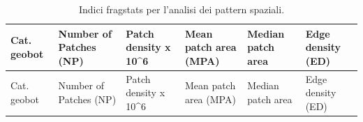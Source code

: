 \documentclass[
  a4paper,
]{book}
\begin{document}
\begin{longtable}[]{@{}
  >{\raggedleft\arraybackslash}p{}
  >{\raggedleft\arraybackslash}p{}
  >{\raggedleft\arraybackslash}p{}
  >{\raggedleft\arraybackslash}p{}
  >{\raggedleft\arraybackslash}p{}
  >{\raggedleft\arraybackslash}p{}@{}}
\caption{\label{tab:fragIndex1} Indici fragstats per l'analisi dei pattern spaziali.}\tabularnewline
\toprule\noalign{}
\begin{minipage}[b]{\linewidth}\raggedleft
Cat. geobot
\end{minipage} & \begin{minipage}[b]{\linewidth}\raggedleft
Number of Patches (NP)
\end{minipage} & \begin{minipage}[b]{\linewidth}\raggedleft
Patch density x 10\^{}6
\end{minipage} & \begin{minipage}[b]{\linewidth}\raggedleft
Mean patch area (MPA)
\end{minipage} & \begin{minipage}[b]{\linewidth}\raggedleft
Median patch area
\end{minipage} & \begin{minipage}[b]{\linewidth}\raggedleft
Edge density (ED)
\end{minipage} \\
\midrule\noalign{}
\endfirsthead
\toprule\noalign{}
\begin{minipage}[b]{\linewidth}\raggedleft
Cat. geobot
\end{minipage} & \begin{minipage}[b]{\linewidth}\raggedleft
Number of Patches (NP)
\end{minipage} & \begin{minipage}[b]{\linewidth}\raggedleft
Patch density x 10\^{}6
\end{minipage} & \begin{minipage}[b]{\linewidth}\raggedleft
Mean patch area (MPA)
\end{minipage} & \begin{minipage}[b]{\linewidth}\raggedleft
Median patch area
\end{minipage} & \begin{minipage}[b]{\linewidth}\raggedleft
Edge density (ED)

\end{minipage}
\end{longtable}
\end{document}
